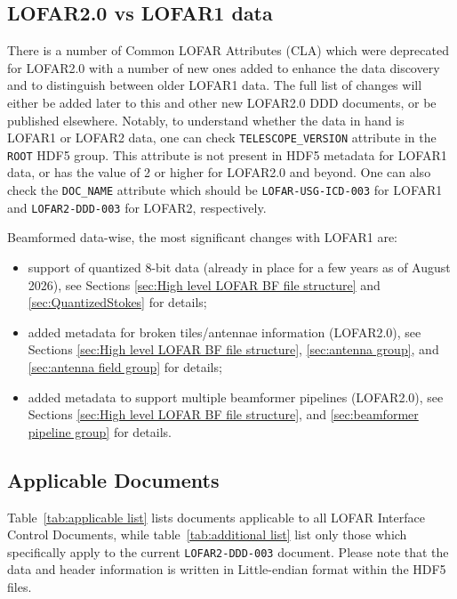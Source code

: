 \documentclass[a4paper,10pt,bibtotoc]{scrartcl}
\begin{document}
\subsection{LOFAR2.0 vs LOFAR1 data}
\label{sec:lofar2.0 vs lofar1 data}
There is a number of Common LOFAR Attributes (CLA) which were deprecated for LOFAR2.0 with a number of new ones added to enhance the data discovery and to distinguish between older LOFAR1 data. The full list of changes will either be added later to this and other new LOFAR2.0 DDD documents, or be published elsewhere. Notably, to understand whether the data in hand is LOFAR1 or LOFAR2 data, one can check \texttt{TELESCOPE\_VERSION} attribute in the \texttt{ROOT} HDF5 group. This attribute is not present in HDF5 metadata for LOFAR1 data, or has the value of 2 or higher for LOFAR2.0 and beyond. One can also check the \texttt{DOC\_NAME} attribute which should be \texttt{LOFAR-USG-ICD-003} for LOFAR1 and \texttt{LOFAR2-DDD-003} for LOFAR2, respectively.

Beamformed data-wise, the most significant changes with LOFAR1 are:
\begin{itemize}
 \item support of quantized 8-bit data (already in place for a few years as of August 2026), see Sections \ref{sec:High level LOFAR BF file structure} and \ref{sec:QuantizedStokes} for details;
 \item added metadata for broken tiles/antennae information (LOFAR2.0), see Sections \ref{sec:High level LOFAR BF file structure}, \ref{sec:antenna group}, and \ref{sec:antenna field group} for details;
 \item added metadata to support multiple beamformer pipelines (LOFAR2.0), see Sections \ref{sec:High level LOFAR BF file structure}, and \ref{sec:beamformer pipeline group} for details.
\end{itemize}


\subsection{Applicable Documents}
\label{sec:applicable documents}
Table~\ref{tab:applicable list} lists documents applicable to all LOFAR Interface Control Documents, while table~\ref{tab:additional list} list only
those which specifically apply to the current \texttt{LOFAR2-DDD-003} document. Please note that the
data and header information is written in Little-endian format within the HDF5 files.
\end{document}
